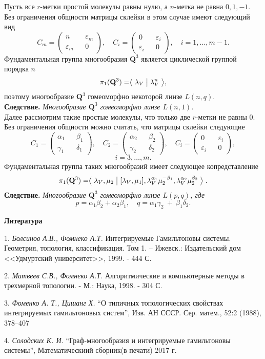 Пусть все $r$-метки простой молекулы равны нулю, а $n$-метка не равна $0, 1, -1$. Без ограничения общности матрицы склейки в этом случае имеют следующий вид
$$
C_m = \begin{pmatrix} n && \varepsilon_m \\ \varepsilon_m && 0 \end{pmatrix}, \quad C_i = \begin{pmatrix} 0 && \varepsilon_i \\ \varepsilon_i && 0 \end{pmatrix},\quad i = 1,\dots, m-1.
$$
Фундаментальная группа многообразия $\mathbf{Q}^3$ является циклической группой порядка $n$
$$
\pi_1(\mathbf{Q}^3) = \bigm\langle \lambda_V \bigm| \lambda_V^n \bigm\rangle,
$$
поэтому многообразие $\mathbf{Q}^3$ гомеоморфно некоторой линзе $L(n, q)$.
\\

\textbf{Следствие.}{ \it
Многообразие $\mathbf{Q}^3$ гомеоморфно линзе $L(n, 1)$.}
\\

Далее рассмотрим такие простые молекулы, что только две $r$-метки не равны 0. Без ограничения общности можно считать, что матрицы склейки следующие
$$
C_1 = \begin{pmatrix} \alpha_1 && \beta_1 \\ \gamma_1 && \delta_1 \end{pmatrix}, \quad
C_2 = \begin{pmatrix} \alpha_2 && \beta_2 \\ \gamma_2 && \delta_2 \end{pmatrix},
\quad C_i = \begin{pmatrix} 0 && \varepsilon_i \\ \varepsilon_i && 0 \end{pmatrix},
$$
$$
i = 3,\dots, m.
$$
Фундаментальная группа таких многообразий имеет следующее копредставление
$$
\pi_1(\mathbf{Q}^3) = \bigm\langle \lambda_V, \mu_2 \bigm|  [\lambda_V, \mu_1],
\lambda^{\alpha_1}_V\mu^{-\beta_1}_2, \lambda^{\alpha_2}_V\mu^{\beta_2}_2 \bigm\rangle.
$$
\textbf{Следствие.} {\it
Многообразие $\mathbf{Q}^3$ гомеоморфно линзе $L(p, q)$, где
$$
p = \alpha_1\beta_2 + \alpha_2\beta_1, \quad q = \alpha_1\gamma_2~+~\beta_1\delta_2.
$$
}
\smallskip \centerline{\bf Литература}\nopagebreak

1. {\it Болсинов А.В., Фомнеко А.Т.}  Интегрируемые Гамильтоновы системы. Геометрия, топология, классификация. Том 1. -- Ижевск.: Издательский дом <<Удмуртский университет>>, 1999. - 444 С.

2. {\it Матвеев С.В., Фомнеко А.Т.} Алгоритмические и компьютерные методы в трехмерной топологии.  - М.: Наука, 1998. - 304 С.

3. {\it Фоменко А. Т., Цишанг Х.} “О типичных топологических свойствах интегрируемых гамильтоновых систем”, Изв. АН СССР. Сер. матем., 52:2 (1988), 378–407

4. {\it Солодских К. И.} “Граф-многообразия и интегрируемые гамильтоновы системы”, Математическиий сборник(в печати) 2017 г.

